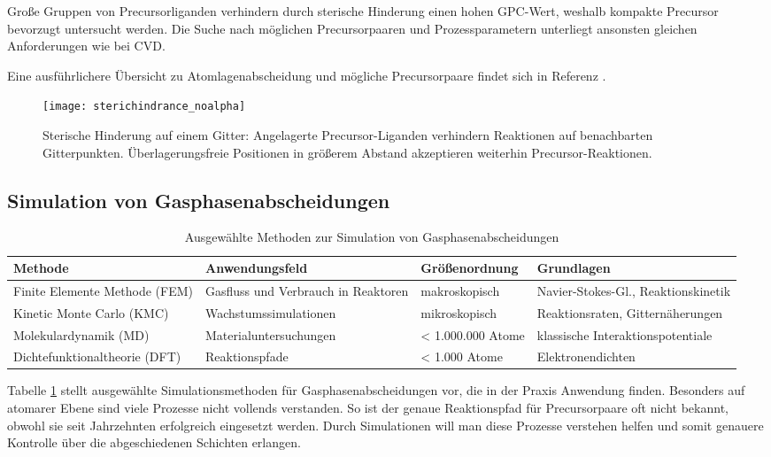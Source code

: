 Große Gruppen von Precursorliganden verhindern durch sterische Hinderung einen hohen GPC-Wert, weshalb kompakte Precursor bevorzugt untersucht werden. 
Die Suche nach möglichen Precursorpaaren und Prozessparametern unterliegt ansonsten gleichen Anforderungen wie bei CVD.

Eine ausführlichere Übersicht zu Atomlagenabscheidung und mögliche Precursorpaare findet sich in Referenz \cite{puurunen_surface_2005}.

\begin{figure}
  \centering
  \texttt{[image: sterichindrance\_noalpha]}
  \caption[Sterische Hinderung]{Sterische Hinderung auf einem Gitter:
    Angelagerte Precursor-Liganden verhindern Reaktionen auf benachbarten Gitterpunkten.
    Überlagerungsfreie Positionen in größerem Abstand akzeptieren weiterhin Precursor-Reaktionen.
  }
  \label{fig:steric}
\end{figure}

\subsection{Simulation von Gasphasenabscheidungen}

\begin{table}
  \centering
  \begin{tabularx}{\textwidth}{XXXX}
    \hline
    Methode & Anwendungsfeld & Größenordnung & Grundlagen \\
    \hline
    Finite Elemente Methode (FEM) & Gasfluss und Verbrauch in Reaktoren & makroskopisch & Navier-Stokes-Gl., Reaktionskinetik \\
    Kinetic Monte Carlo (KMC) & Wachstums\-simulationen & mikroskopisch & Reaktionsraten, Gitternäherungen \\
    Molekular\-dynamik (MD) & Material\-unter\-suchungen & < 1.000.000 Atome & klassische Interaktionspotentiale \\
    Dichte\-funktional\-theorie (DFT) & Reaktionspfade & < 1.000 Atome & Elektronendichten \\
    \hline
  \end{tabularx}
  \caption[Ausgewählte Methoden zur Simulation von Gasphasenabscheidungen]{Ausgewählte Methoden zur Simulation von Gasphasenabscheidungen}
  \label{tab:deposition-simulations}
\end{table}

Tabelle \ref{tab:deposition-simulations} stellt ausgewählte Simulationsmethoden für Gasphasenabscheidungen vor, die in der Praxis Anwendung finden.
Besonders auf atomarer Ebene sind viele Prozesse nicht vollends verstanden.
So ist der genaue Reaktionspfad für Precursorpaare oft nicht bekannt, obwohl sie seit Jahrzehnten erfolgreich eingesetzt werden.
Durch Simulationen will man diese Prozesse verstehen helfen und somit genauere Kontrolle über die abgeschiedenen Schichten erlangen.

